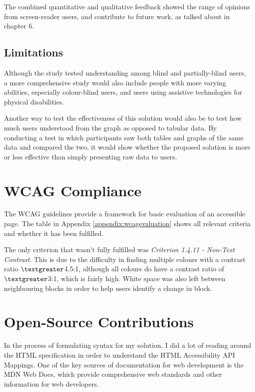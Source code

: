 \documentclass[ %
                    author={Aleena Baig},
                supervisor={Dr Simon Lock},
                    degree={BSc},
                     title={On Making Web Accessible Graphs},
                  subtitle={},
                      year={2019} ]{dissertation}
\begin{document}
The combined quantitative and qualitative feedback showed the range of opinions from screen-reader users, and contribute to future work, as talked about in chapter 6.

\subsection{Limitations}

Although the study tested understanding among blind and partially-blind users, a more comprehensive study would also include people with more varying abilities, especially colour-blind users, and users using assistive technologies for physical disabilities.

Another way to test the effectiveness of this solution would also be to test how much users understood from the graph as opposed to tabular data. By conducting a test in which participants saw both tables and graphs of the same data and compared the two, it would show whether the proposed solution is more or less effective than simply presenting raw data to users.

\section{WCAG Compliance}

The WCAG guidelines provide a framework for basic evaluation of an accessible page. The table in Appendix \ref{appendix:wcagevaluation} shows all relevant criteria and whether it has been fulfilled.

The only criterion that wasn't fully fulfilled was \textit{Criterion 1.4.11 - Non-Text Contrast}. This is due to the difficulty in finding multiple colours with a contrast ratio $\textgreater$4.5:1, although all colours do have a contrast ratio of $\textgreater$3:1, which is fairly high. White space was also left between neighbouring blocks in order to help users identify a change in block.

\section{Open-Source Contributions}

In the process of formulating syntax for my solution, I did a lot of reading around the HTML specification\cite{htmlspec} in order to understand the HTML Accessibility API Mappings. One of the key sources of documentation for web development is the MDN Web Docs\cite{mdndocs}, which provide comprehensive web standards and other information for web developers.
\end{document}
